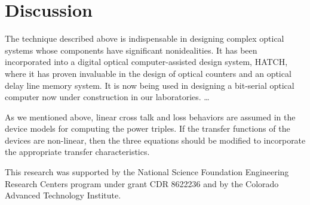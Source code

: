 \section{Discussion}
The technique described above is indispensable in designing complex optical
systems whose components have significant nonidealities.  It has been
incorporated into a digital optical computer-assisted design system,
HATCH,\cite{10} where it has proven invaluable in the design of optical
counters\cite{11,12} and an optical delay line memory system.\cite{13} It
is now being used in designing a bit-serial optical computer now under
construction in our laboratories.  \ldots

As we mentioned above, linear cross talk and loss behaviors are assumed in
the device models for computing the power triples.  If the transfer
functions of the devices are non-linear, then the three equations should be
modified to incorporate the appropriate transfer characteristics.

\acknowledgments
This research was supported by the National Science Foundation Engineering
Research Centers program under grant CDR 8622236 and by the Colorado
Advanced Technology Institute.


